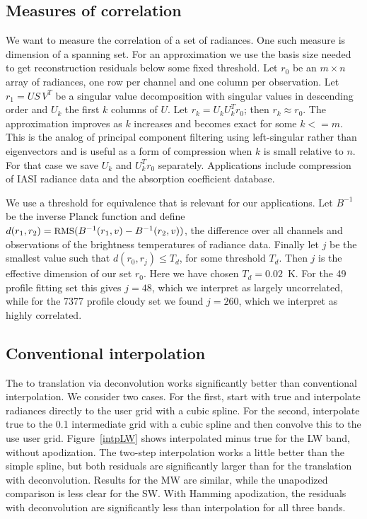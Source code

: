 \documentclass[10pt,twocolumn]{article}
\begin{document}
\subsection{Measures of correlation}

We want to measure the correlation of a set of radiances.  One such
measure is dimension of a spanning set.  For an approximation we use
the basis size needed to get reconstruction residuals below some
fixed threshold.  Let $r_0$ be an $m \times n$ array of radiances,
one row per channel and one column per observation.  Let $r_1 = U
S\,V^T$ be a singular value decomposition with singular values in
descending order and $U_k$ the first $k$ columns of $U$.  Let $r_k =
U_k U_k^T r_0$; then $r_k \approx r_0$.  The approximation improves
as $k$ increases and becomes exact for some $k <= m$.  This is the
analog of principal component filtering using left-singular rather
than eigenvectors and is useful as a form of compression when $k$ is
small relative to $n$.  For that case we save $U_k$ and $U_k^T r_0$
separately.  Applications include compression of IASI radiance data
and the {\kcarta} absorption coefficient database.

We use a threshold for equivalence that is relevant for our
applications.  Let $B^{-1}$ be the inverse Planck function and
define $d(r_1, r_2) = \mbox{\small RMS}(B^{-1}(r_1, v) - B^{-1}(r_2, v))$, the
{\rms} difference over all channels and observations of the
brightness temperatures of radiance data.  Finally let $j$ be the
smallest value such that $d(r_0, r_j) \le T_d$, for some threshold
$T_d$.  Then $j$ is the effective dimension of our set $r_0$.  Here
we have chosen $T_d = 0.02$~K.  For the 49 profile fitting set this
gives $j=48$, which we interpret as largely uncorrelated, while for
the 7377 profile cloudy set we found $j=260$, which we interpret as
highly correlated.

\subsection{Conventional interpolation}

The {\airs} to {\cris} translation via deconvolution works
significantly better than conventional interpolation.  We consider
two cases.  For the first, start with true {\airs} and interpolate
radiances directly to the {\cris} user grid with a cubic spline.
For the second, interpolate true {\airs} to the 0.1 {\wn}
intermediate grid with a cubic spline and then convolve this to the
use {\cris} user grid.  Figure~\ref{intpLW} shows interpolated
{\cris} minus true {\cris} for the LW band, without apodization.
The two-step interpolation works a little better than the simple
spline, but both residuals are significantly larger than for the
translation with deconvolution.  Results for the MW are similar,
while the unapodized comparison is less clear for the SW.  With
Hamming apodization, the residuals with deconvolution are
significantly less than interpolation for all three bands.
\end{document}
